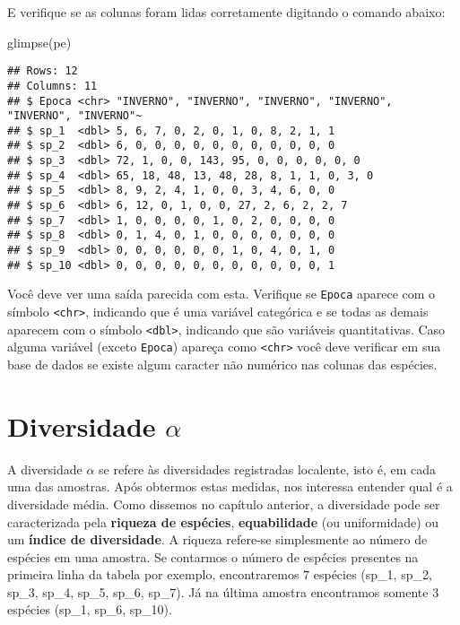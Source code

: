 \documentclass[
]{book}
\newenvironment{Shaded}{\begin{snugshade}}{\end{snugshade}}
\newcommand{\FunctionTok}[1]{\textcolor[rgb]{0.00,0.00,0.00}{#1}}
\newcommand{\NormalTok}[1]{#1}
\begin{document}
E verifique se as colunas foram lidas corretamente digitando o comando abaixo:

\begin{Shaded}
\begin{Highlighting}[]
\FunctionTok{glimpse}\NormalTok{(pe)}
\end{Highlighting}
\end{Shaded}

\begin{verbatim}
## Rows: 12
## Columns: 11
## $ Epoca <chr> "INVERNO", "INVERNO", "INVERNO", "INVERNO", "INVERNO", "INVERNO"~
## $ sp_1  <dbl> 5, 6, 7, 0, 2, 0, 1, 0, 8, 2, 1, 1
## $ sp_2  <dbl> 6, 0, 0, 0, 0, 0, 0, 0, 0, 0, 0, 0
## $ sp_3  <dbl> 72, 1, 0, 0, 143, 95, 0, 0, 0, 0, 0, 0
## $ sp_4  <dbl> 65, 18, 48, 13, 48, 28, 8, 1, 1, 0, 3, 0
## $ sp_5  <dbl> 8, 9, 2, 4, 1, 0, 0, 3, 4, 6, 0, 0
## $ sp_6  <dbl> 6, 12, 0, 1, 0, 0, 27, 2, 6, 2, 2, 7
## $ sp_7  <dbl> 1, 0, 0, 0, 0, 1, 0, 2, 0, 0, 0, 0
## $ sp_8  <dbl> 0, 1, 4, 0, 1, 0, 0, 0, 0, 0, 0, 0
## $ sp_9  <dbl> 0, 0, 0, 0, 0, 0, 1, 0, 4, 0, 1, 0
## $ sp_10 <dbl> 0, 0, 0, 0, 0, 0, 0, 0, 0, 0, 0, 1
\end{verbatim}

Você deve ver uma saída parecida com esta. Verifique se \texttt{Epoca} aparece com o símbolo \texttt{\textless{}chr\textgreater{}}, indicando que é uma variável categórica e se todas as demais aparecem com o símbolo \texttt{\textless{}dbl\textgreater{}}, indicando que são variáveis quantitativas. Caso alguma variável (exceto \texttt{Epoca}) apareça como \texttt{\textless{}chr\textgreater{}} você deve verificar em sua base de dados se existe algum caracter não numérico nas colunas das espécies.

\hypertarget{diversidade-alpha}{%
\section{\texorpdfstring{Diversidade \(\alpha\)}{Diversidade \textbackslash alpha}}\label{diversidade-alpha}}

A diversidade \(\alpha\) se refere às diversidades registradas localente, isto é, em cada uma das amostras. Após obtermos estas medidas, nos interessa entender qual é a diversidade média. Como dissemos no capítulo anterior, a diversidade pode ser caracterizada pela \textbf{riqueza de espécies}, \textbf{equabilidade} (ou uniformidade) ou um \textbf{índice de diversidade}. A riqueza refere-se simplesmente ao número de espécies em uma amostra. Se contarmos o número de espécies presentes na primeira linha da tabela por exemplo, encontraremos \(7\) espécies (sp\_1, sp\_2, sp\_3, sp\_4, sp\_5, sp\_6, sp\_7). Já na última amostra encontramos somente \(3\) espécies (sp\_1, sp\_6, sp\_10).
\end{document}
